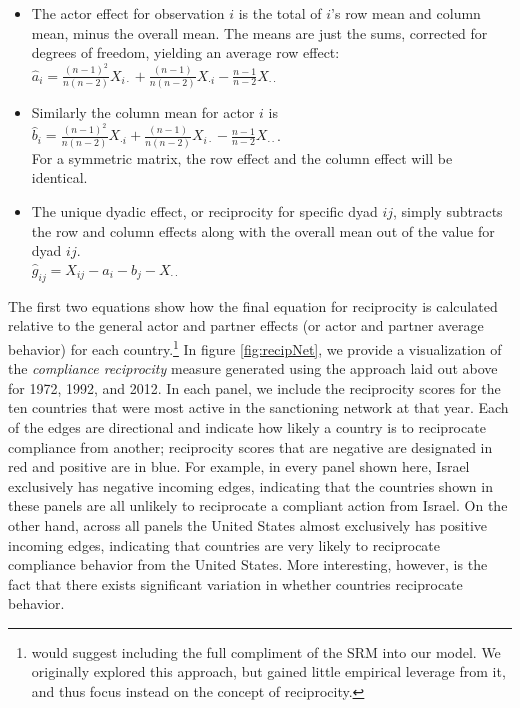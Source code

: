  \begin{itemize}
	 \item The actor effect for observation $i$ is the total of $i$'s row mean and column mean, minus the overall mean.  The means are just the sums, corrected for degrees of freedom, yielding an average row effect:\\
	 $\hat{a}_i = \frac{(n-1)^2}{n(n-2)} X_{i \cdot} + \frac{(n-1)}{n(n-2)} X_{\cdot i} -  \frac{n-1}{n-2} X_{\cdot \cdot} $
	\item Similarly the column mean for actor $i$ is \\
	 $\hat{b}_i = \frac{(n-1)^2}{n(n-2)} X_{\cdot i} + \frac{(n-1)}{n(n-2)} X_{i \cdot } -  \frac{n-1}{n-2} X_{\cdot \cdot} $.\\ For a symmetric matrix, the row effect and the column effect will be identical.
	\item The unique dyadic effect, or reciprocity for specific dyad $ij$, simply subtracts the row and column effects along with the overall mean out of the value for dyad $ij$. \\
	$\hat{g}_{ij} = X_{ij} - \hat{a}_i - \hat{b}_j - X_{\cdot \cdot}$
 \end{itemize}

\doublespacing
The first two equations show how the final equation for reciprocity is calculated relative to the general actor and partner effects (or actor and partner average behavior) for each country.\footnote{\cite{kenny1994interpersonal} would suggest including the full compliment of the SRM into our model. We originally explored this approach, but gained little empirical leverage from it, and thus focus instead on the concept of reciprocity.} In figure \ref{fig:recipNet}, we provide a visualization of the \textit{compliance reciprocity} measure generated using the approach laid out above for 1972, 1992, and 2012. In each panel, we include the reciprocity scores for the ten countries that were most active in the sanctioning network at that year. Each of the edges are directional and indicate how likely a country is to reciprocate compliance from another; reciprocity scores that are negative are designated in red and positive are in blue. For example, in every panel shown here, Israel exclusively has negative incoming edges, indicating that the countries shown in these panels are all unlikely to reciprocate a compliant action from Israel. On the other hand, across all panels the United States almost exclusively has positive incoming edges, indicating that countries are very likely to reciprocate compliance behavior from the United States. More interesting, however, is the fact that there exists significant variation in whether countries reciprocate behavior. 

